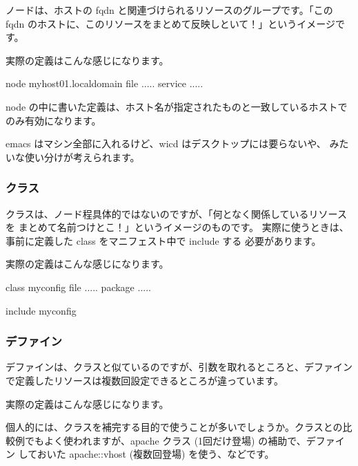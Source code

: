 \documentclass[mingoth,a4paper]{jsarticle}
\begin{document}
ノードは、ホストの fqdn と関連づけられるリソースのグループです。「この
fqdn のホストに、このリソースをまとめて反映しといて！」というイメージです。

実際の定義はこんな感じになります。

\begin{commandline}
node myhost01.localdomain {
  file {.....}
  service {.....}
}
\end{commandline}

node の中に書いた定義は、ホスト名が指定されたものと一致しているホストで
のみ有効になります。

emacs はマシン全部に入れるけど、wicd はデスクトップには要らないや、
みたいな使い分けが考えられます。

\subsubsection{クラス}

クラスは、ノード程具体的ではないのですが、「何となく関係しているリソースを
まとめて名前つけとこ！」というイメージのものです。
実際に使うときは、事前に定義した class をマニフェスト中で include する
必要があります。

実際の定義はこんな感じになります。

\begin{commandline}
class myconfig {
  file {.....}
  package {.....}
}

include myconfig
\end{commandline}

\subsubsection{デファイン}

デファインは、クラスと似ているのですが、引数を取れるところと、デファイン
で定義したリソースは複数回設定できるところが違っています。

実際の定義はこんな感じになります。


個人的には、クラスを補完する目的で使うことが多いでしょうか。クラスとの比
較例でもよく使われますが、apache クラス (1回だけ登場) の補助で、デファイン
しておいた apache::vhost (複数回登場) を使う、などです。
\end{document}
